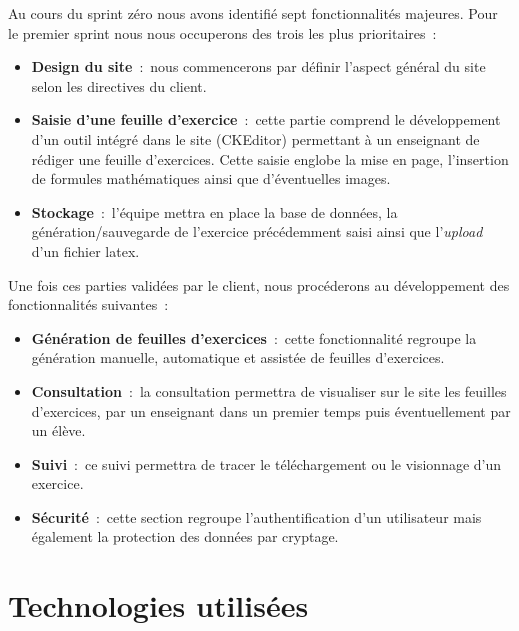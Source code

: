 Au cours du sprint zéro nous avons identifié sept fonctionnalités majeures. Pour le premier sprint nous nous occuperons des trois les plus prioritaires~:
\medskip

\begin{itemize}
\item \textbf{Design du site}~:~nous commencerons par définir l'aspect général du site selon les directives du client.  
\smallskip

\item \textbf{Saisie d'une feuille d'exercice}~:~cette partie comprend le développement d'un outil intégré dans le site (CKEditor) permettant à un enseignant de rédiger une feuille d'exercices. Cette saisie englobe la mise en page, l'insertion de formules mathématiques ainsi que d'éventuelles images.
\smallskip

\item \textbf{Stockage}~:~l'équipe mettra en place la base de données,  la génération/sauvegarde de l'exercice précédemment saisi ainsi que l'\emph{upload} d'un fichier latex.
\smallskip
\end{itemize}

Une fois ces parties validées par le client, nous procéderons au développement des fonctionnalités suivantes~:
\medskip

\begin{itemize}
\item \textbf{Génération de feuilles d'exercices}~:~cette fonctionnalité regroupe la génération manuelle, automatique et assistée de feuilles d'exercices.
\smallskip

\item \textbf{Consultation}~:~la consultation permettra de visualiser sur le site les feuilles d'exercices, par un enseignant dans un premier temps puis éventuellement par un élève.
\smallskip

\item \textbf{Suivi}~:~ce suivi permettra de tracer le téléchargement ou le visionnage d'un exercice.
\smallskip

\item \textbf{Sécurité}~:~cette section regroupe l'authentification d'un utilisateur mais également la protection des données par cryptage.\\
\end{itemize}
\newpage

\section{Technologies utilisées}

